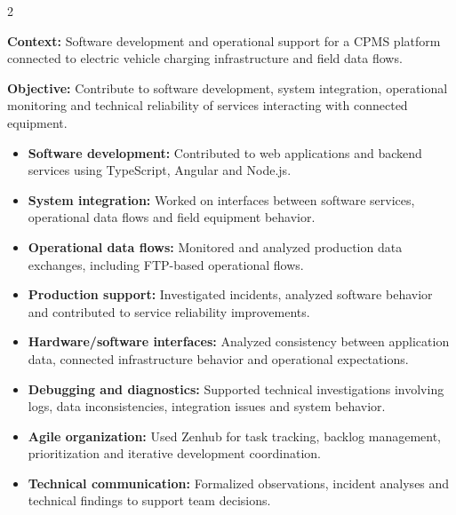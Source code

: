 \documentclass[8pt,a4paper,ragged2e,withhyper]{altacv}
\begin{document}



\makecvheader
\vspace{-0.3cm}


\begin{paracol}{2}



\textbf{Context:} Software development and operational support for a CPMS platform connected to electric vehicle charging infrastructure and field data flows.

\textbf{Objective:} Contribute to software development, system integration, operational monitoring and technical reliability of services interacting with connected equipment.

\begin{itemize}
  \item \textbf{Software development:} Contributed to web applications and backend services using TypeScript, Angular and Node.js.
  \item \textbf{System integration:} Worked on interfaces between software services, operational data flows and field equipment behavior.
  \item \textbf{Operational data flows:} Monitored and analyzed production data exchanges, including FTP-based operational flows.
  \item \textbf{Production support:} Investigated incidents, analyzed software behavior and contributed to service reliability improvements.
  \item \textbf{Hardware/software interfaces:} Analyzed consistency between application data, connected infrastructure behavior and operational expectations.
  \item \textbf{Debugging and diagnostics:} Supported technical investigations involving logs, data inconsistencies, integration issues and system behavior.
  \item \textbf{Agile organization:} Used Zenhub for task tracking, backlog management, prioritization and iterative development coordination.
  \item \textbf{Technical communication:} Formalized observations, incident analyses and technical findings to support team decisions.
\end{itemize}


\end{paracol}
\end{document}
